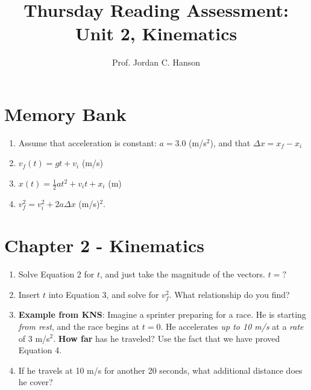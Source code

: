 \documentclass{article}
\begin{document}
\title{Thursday Reading Assessment: Unit 2, Kinematics}
\author{Prof. Jordan C. Hanson}

\maketitle

\section{Memory Bank}

\begin{enumerate}
\item Assume that acceleration is constant: $a = 3.0$ (m/s$^2$), and that $\Delta x = x_f - x_i$
\item $v_f(t) = gt + v_{i}$ (m/s)
\item $x(t) = \frac{1}{2}at^2 + v_{i} t + x_{i}$ (m)
\item $v_f^2 = v_i^2 + 2a\Delta x$ (m/s)$^2$.
\end{enumerate}

\section{Chapter 2 - Kinematics}

\begin{enumerate}
\item Solve Equation 2 for $t$, and just take the magnitude of the vectors. $t=?$ \\ \vspace{2cm}
\item Insert $t$ into Equation 3, and solve for $v_f^2$.  What relationship do you find? \\ \vspace{3cm}
\item \textbf{Example from KNS}: Imagine a sprinter preparing for a race.  He is starting \textit{from rest}, and the race begins at $t=0$.  He accelerates \textit{up to 10 m/s} at a \textit{rate} of 3 m/s$^2$.  \textbf{How far} has he traveled?  Use the fact that we have proved Equation 4. \\ \vspace{2cm}
\item If he travels at 10 m/s for another 20 seconds, what additional distance does he cover?
\end{enumerate}
\end{document}

